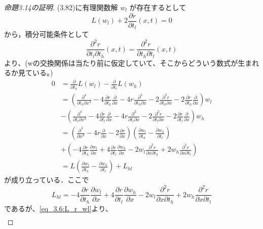 \documentclass[paper=a4, fontsize=11pt]{jlreq} %
\newenvironment{story}{%
  \begin{mdframed}[
    backgroundcolor=red!5, %
    linewidth=0pt,         %
    innertopmargin=10pt,   %
    innerbottommargin=10pt,
    innerrightmargin=10pt, %
    innerleftmargin=10pt
  ]%
}{%
  \end{mdframed}%
}
\theoremstyle{break}
\theoremstyle{qa}
\begin{document}
\begin{story}
\begin{proof}[命題3.14の証明]
(3.82)に有理関数解 $w_l$ が存在するとして
\begin{equation}\label{eq_3.6:L_r_wl}
    L(w_l) + 2\frac{\partial r}{\partial t_l}(x,t) = 0
\end{equation}
から，積分可能条件として
\[
\frac{\partial^{2} r}{\partial t_l\partial t_{h}}(x,t)=\frac{\partial^{2} r}{\partial t_h\partial t_{l}}(x,t)
\]
より、(wの交換関係は当たり前に仮定していて、そこからどういう数式が生まれるか見ている。)
\begin{align}
    0 &= \frac{\partial}{\partial t_h}L(w_l) - \frac{\partial}{\partial t_l}L(w_h)\\
    &= \left(\frac{\partial^{4}}{\partial t_h\partial x^{3}}-4\frac{\partial r}{\partial t_{h}}\frac{\partial}{\partial x}-4r\frac{\partial^{2}}{\partial t_{h}\partial x}-2\frac{\partial^{2}r}{\partial t_{h}\partial x}-2\frac{\partial r}{\partial t_{h}}\frac{\partial}{\partial x}\right)w_{l}\\
    &-\left(\frac{\partial^{4}}{\partial t_l\partial x^{3}}-4\frac{\partial r}{\partial t_{l}}\frac{\partial}{\partial x}-4r\frac{\partial^{2}}{\partial t_{l}\partial x}-2\frac{\partial^{2}r}{\partial t_{l}\partial x}-2\frac{\partial r}{\partial t_{l}}\frac{\partial}{\partial x}\right)w_{h}\\
    &= \left(\frac{\partial^{3}}{\partial x^{3}}-4r\frac{\partial}{\partial x}-2\frac{\partial r}{\partial x}\right)(\frac{\partial w_{l}}{\partial t_{h}}-\frac{\partial w_{h}}{\partial t_{l}})\\
    &+\left(-4\frac{\partial r}{\partial t_h}\frac{\partial w_l}{\partial x} + 4\frac{\partial r}{\partial t_l}\frac{\partial w_h}{\partial x} - 2w_l\frac{\partial^2 r}{\partial x \partial t_h} + 2w_h\frac{\partial^2 r}{\partial x \partial t_l}\right)\\
    &= L\left( \frac{\partial w_l}{\partial t_h} - \frac{\partial w_h}{\partial t_l} \right) + L_{hl} \label{eq:3.84}
\end{align}
が成り立っている．ここで
\begin{equation*}
    L_{hl} = -4\frac{\partial r}{\partial t_h}\frac{\partial w_l}{\partial x} + 4\frac{\partial r}{\partial t_l}\frac{\partial w_h}{\partial x} - 2w_l\frac{\partial^2 r}{\partial x \partial t_h} + 2w_h\frac{\partial^2 r}{\partial x \partial t_l}
\end{equation*}
であるが、\eqref{eq_3.6:L_r_wl}より、
\begin{align*}

\end{align*}
\end{proof}
\end{story}
\end{document}
